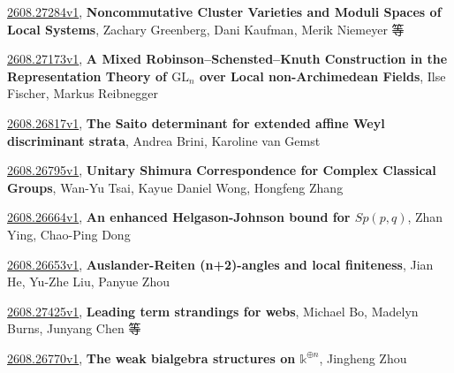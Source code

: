 \documentclass[9pt, a4paper]{article}
\theoremstyle{plain}
\theoremstyle{definition}
\theoremstyle{remark}
\newcommand{\arxiv}[3]{\href{https://arxiv.org/abs/#1}{#1}, \textbf{\textcolor{arxivblue}{#2}}, #3}
\begin{document}
\arxiv{2608.27284v1}{Noncommutative Cluster Varieties and Moduli Spaces of Local Systems}{Zachary Greenberg, Dani Kaufman, Merik Niemeyer 等}

\arxiv{2608.27173v1}{A Mixed Robinson--Schensted--Knuth Construction in the Representation Theory of $\mathrm{GL}_n$ over Local non-Archimedean Fields}{Ilse Fischer, Markus Reibnegger}

\arxiv{2608.26817v1}{The Saito determinant for extended affine Weyl discriminant strata}{Andrea Brini, Karoline van Gemst}

\arxiv{2608.26795v1}{Unitary Shimura Correspondence for Complex Classical Groups}{Wan-Yu Tsai, Kayue Daniel Wong, Hongfeng Zhang}

\arxiv{2608.26664v1}{An enhanced Helgason-Johnson bound for $Sp(p, q)$}{Zhan Ying, Chao-Ping Dong}

\arxiv{2608.26653v1}{Auslander-Reiten (n+2)-angles and local finiteness}{Jian He, Yu-Zhe Liu, Panyue Zhou}

\arxiv{2608.27425v1}{Leading term strandings for webs}{Michael Bo, Madelyn Burns, Junyang Chen 等}

\arxiv{2608.26770v1}{The weak bialgebra structures on $\mathbb{k}^{\oplus n}$}{Jingheng Zhou}

\end{document}
